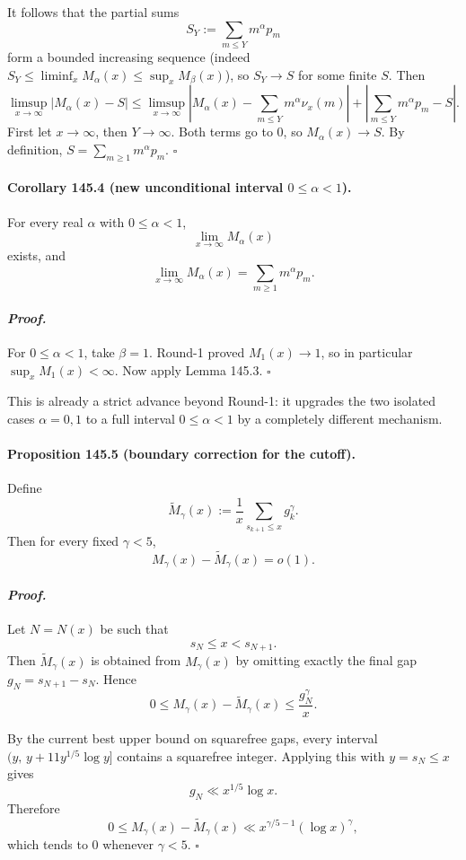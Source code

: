 It follows that the partial sums
\[
S_Y:=\sum_{m\le Y} m^\alpha p_m
\]
form a bounded increasing sequence (indeed $S_Y\le \liminf_x M_\alpha(x)\le \sup_x M_\beta(x)$),
so $S_Y\to S$ for some finite $S$. Then
\[
\limsup_{x\to\infty}|M_\alpha(x)-S|
\le
\limsup_{x\to\infty}\left|M_\alpha(x)-\sum_{m\le Y} m^\alpha \nu_x(m)\right|
+
\left|\sum_{m\le Y} m^\alpha p_m-S\right|.
\]
First let $x\to\infty$, then $Y\to\infty$. Both terms go to $0$, so $M_\alpha(x)\to S$.
By definition, $S=\sum_{m\ge 1} m^\alpha p_m$. \hfill $\square$

\paragraph{\textbf{Corollary 145.4 (new unconditional interval $0\le \alpha<1$).}}
For every real $\alpha$ with $0\le \alpha<1$,
\[
\lim_{x\to\infty} M_\alpha(x)
\]
exists, and
\[
\lim_{x\to\infty} M_\alpha(x)=\sum_{m\ge 1} m^\alpha p_m.
\]

\paragraph{\textit{Proof.}}
For $0\le \alpha<1$, take $\beta=1$. Round-1 proved $M_1(x)\to 1$, so in particular
$\sup_x M_1(x)<\infty$. Now apply Lemma 145.3. \hfill $\square$

\medskip

This is already a strict advance beyond Round-1: it upgrades the two isolated cases $\alpha=0,1$
to a full interval $0\le \alpha<1$ by a completely different mechanism.

\paragraph{\textbf{Proposition 145.5 (boundary correction for the cutoff).}}
Define
\[
\widetilde M_\gamma(x):=\frac1x\sum_{s_{k+1}\le x} g_k^\gamma.
\]
Then for every fixed $\gamma<5$,
\[
M_\gamma(x)-\widetilde M_\gamma(x)=o(1).
\]

\paragraph{\textit{Proof.}}
Let $N=N(x)$ be such that
\[
s_N\le x < s_{N+1}.
\]
Then $\widetilde M_\gamma(x)$ is obtained from $M_\gamma(x)$ by omitting exactly the final gap
$g_N=s_{N+1}-s_N$. Hence
\[
0\le M_\gamma(x)-\widetilde M_\gamma(x)\le \frac{g_N^\gamma}{x}.
\]

By the current best upper bound on squarefree gaps, every interval $(y,\,y+11y^{1/5}\log y]$
contains a squarefree integer. Applying this with $y=s_N\le x$ gives
\[
g_N\ll x^{1/5}\log x.
\]
Therefore
\[
0\le M_\gamma(x)-\widetilde M_\gamma(x)
\ll
x^{\gamma/5-1}(\log x)^\gamma,
\]
which tends to $0$ whenever $\gamma<5$. \hfill $\square$

